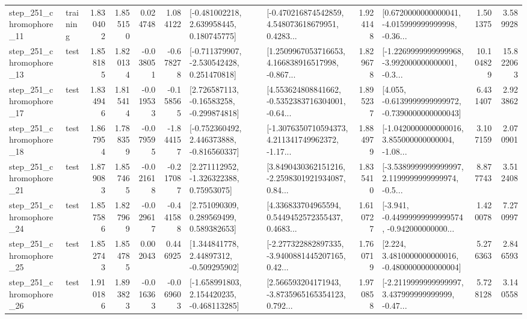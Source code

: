 \begin{tabular}{llrrrrllrlrr}
  step\_251\_chromophore\_11 &  training &      1.830402 &    1.855150 &      0.024748 &  1.084122 &    [-0.481002218, 2.639958445, 0.180745775] &  [-0.470216874542859, 4.548073618679951, 0.4283... &       1.924148 &  [0.6720000000000041, -4.015999999999998, -0.36... &            1.501375 &          3.589928 \\
  step\_251\_chromophore\_13 &      test &      1.858185 &    1.820134 &     -0.038051 & -0.678278 &   [-0.711379907, -2.530542428, 0.251470818] &  [1.2509967053716653, 4.166838916517998, -0.867... &       1.829678 &  [-1.2269999999999968, -3.992000000000001, -0.3... &           10.104829 &         15.822063 \\
  step\_251\_chromophore\_17 &      test &      1.834946 &    1.815414 &     -0.019533 & -0.158565 &    [2.726587113, -0.16583258, -0.299874818] &  [4.553624808841662, -0.5352383716304001, -0.64... &       1.895237 &  [4.055, -0.6139999999999972, -0.7390000000000043] &            6.431407 &          2.923862 \\
  step\_251\_chromophore\_18 &      test &      1.867954 &    1.788359 &     -0.079595 & -1.844157 &   [-0.752360492, 2.446373888, -0.816560337] &  [-1.3076350710594373, 4.211341749962372, -1.17... &       1.884979 &  [-1.0420000000000016, 3.855000000000004, -1.08... &            3.107159 &          2.070901 \\
  step\_251\_chromophore\_21 &      test &      1.879083 &    1.857465 &     -0.021618 & -0.217087 &     [2.271112952, -1.326322388, 0.75953075] &  [3.8490430362151216, -2.2598301921934087, 0.84... &       1.835410 &  [-3.5389999999999997, 2.1199999999999974, -0.5... &            8.877743 &          3.512408 \\
  step\_251\_chromophore\_24 &      test &      1.857586 &    1.827969 &     -0.029617 & -0.441588 &     [2.751090309, 0.289569499, 0.589382653] &  [4.336833704965594, 0.5449452572355437, 0.4683... &       1.610727 &  [-3.941, -0.44999999999999574, -0.942000000000... &            1.420078 &          7.270997 \\
  step\_251\_chromophore\_25 &      test &      1.852743 &    1.854785 &      0.002043 &  0.446925 &     [1.344841778, 2.44897312, -0.509295902] &  [-2.277322882897335, -3.9400881445207165, 0.42... &       1.760719 &   [2.224, 3.4810000000000016, -0.4800000000000004] &            5.276363 &          2.846593 \\
  step\_251\_chromophore\_26 &      test &      1.910186 &    1.893823 &     -0.016363 & -0.069603 &   [-1.658991803, 2.154420235, -0.468113285] &  [2.566593204171943, -3.8735965165354123, 0.792... &       1.970858 &  [-2.2119999999999997, 3.437999999999999, -0.47... &            5.728128 &          3.140558 \\

\end{tabular}
